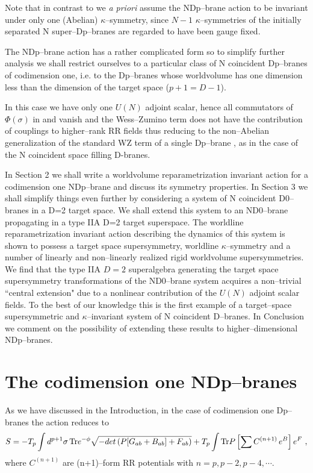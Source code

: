 \documentclass[a4paper,12pt]{article}
\begin{document}
Note that in contrast to \cite{Bergshoeff:2001kt} we {\it a
priori} assume the NDp--brane action to be invariant under only
one (Abelian) $\kappa$--symmetry, since $N-1$ $\kappa$--symmetries
of the initially separated N super--Dp--branes are regarded to
have been gauge fixed.

The NDp--brane action  has a rather complicated form so to
simplify further analysis we shall restrict ourselves to a
particular class of N coincident Dp--branes of codimension one,
i.e. to the Dp--branes whose worldvolume has one dimension less
than the dimension of the target space ($p+1=D-1$).

In this case we have only one $U(N)$ adjoint scalar, hence all
commutators of $\Phi(\sigma)$ in  and  vanish and the
Wess--Zumino term does not have the contribution of couplings to
higher--rank RR fields thus reducing to the non--Abelian
generalization of the standard WZ term of a single Dp--brane
\cite{dbrane}, as in the case of the N coincident space filling D-branes.

In Section 2 we shall write a worldvolume reparametrization
invariant action for a codimension one NDp--brane and discuss its
symmetry properties. In Section 3 we shall simplify things even
further by considering a system of N coincident D0--branes in a
D=2 target space. We shall extend this system to an ND0--brane
propagating in a type IIA D=2 target superspace. The worldline
reparametrization invariant action describing the dynamics of this
system is shown to possess a target space supersymmetry, worldline
$\kappa$--symmetry and a number of linearly and non--linearly realized
rigid worldvolume supersymmetries. We find that the type IIA $D=2$
superalgebra generating the target space supersymmetry
transformations of the ND0--brane system acquires a non--trivial
``central extension" due to a nonlinear  contribution of the
$U(N)$ adjoint scalar fields. To the best of our knowledge this is
the first example of a target--space supersymmetric and
$\kappa$--invariant system of N coincident D--branes. In
Conclusion we comment on the possibility of extending these
results to higher--dimensional NDp--branes.



\section{The codimension one NDp--branes}


As we have discussed in the Introduction, in the case of
codimension one Dp--branes the action  reduces to
\begin{equation}\label{5}
{S}=-T_p \int d^{p+1}\sigma\,{\rm Tr}e^{-\phi}\sqrt{-det\left(
P[G_{ab}+B_{ab}]+ F_{ab}\right)}+ T_p\int {\rm Tr}P\left[ \sum
C^{(n+1)}\,e^B\right]e^{F}\ ,
\end{equation}
where $C^{(n+1)}$ are (n+1)--form RR potentials with
$n=p,p-2,p-4,\cdots$.
\end{document}
